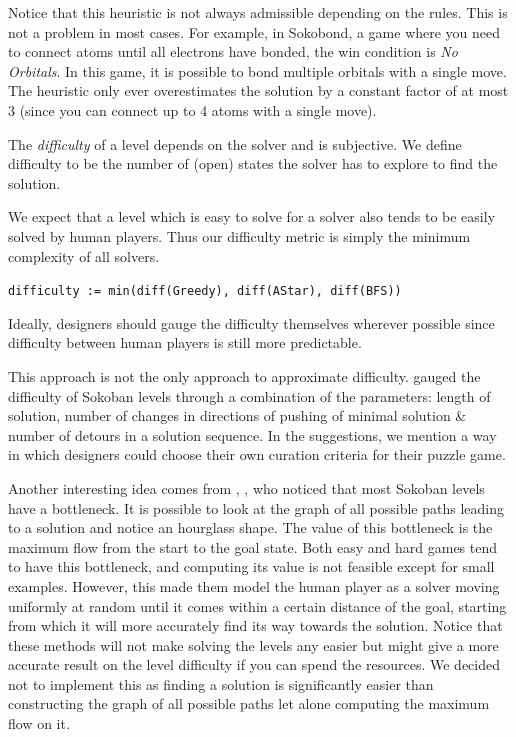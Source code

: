 Notice that this heuristic is not always admissible depending on the rules. This is not a problem in most cases. For example, in Sokobond, a game where you need to connect atoms until all electrons have bonded, the win condition is \textit{No Orbitals}. In this game, it is possible to bond multiple orbitals with a single move. The heuristic only ever overestimates the solution by a constant factor of at most 3 (since you can connect up to 4 atoms with a single move).

The \textit{difficulty} of a level depends on the solver and is subjective. We define difficulty to be the number of (open) states the solver has to explore to find the solution.

We expect that a level which is easy to solve for a solver also tends to be easily solved by human players. Thus our difficulty metric is simply the minimum complexity of all solvers.

\lstinline{difficulty := min(diff(Greedy), diff(AStar), diff(BFS))}

Ideally, designers should gauge the difficulty themselves wherever possible since difficulty between human players is still more predictable.

This approach is not the only approach to approximate difficulty. \cite{Science1996} gauged the difficulty of Sokoban levels through a combination of the parameters: length of solution, number of changes in directions of pushing of minimal solution \& number of detours in a solution sequence. In the suggestions, we mention a way in which designers could choose their own curation criteria for their puzzle game.


Another interesting idea comes from \cite{Pelanek2011}, \cite{Jaru}, who noticed that most Sokoban levels have a bottleneck. It is possible to look at the graph of all possible paths leading to a solution and notice an hourglass shape. The value of this bottleneck is the maximum flow from the start to the goal state. Both easy and hard games tend to have this bottleneck, and computing its value is not feasible except for small examples. However, this made them model the human player as a solver moving uniformly at random until it comes within a certain distance of the goal, starting from which it will more accurately find its way towards the solution. Notice that these methods will not make solving the levels any easier but might give a more accurate result on the level difficulty if you can spend the resources. We decided not to implement this as finding a solution is significantly easier than constructing the graph of all possible paths let alone computing the maximum flow on it.
 
